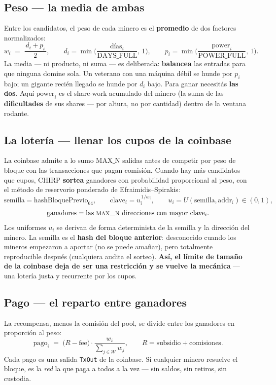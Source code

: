 \documentclass[11pt]{article}
\begin{document}
\subsection{Peso --- la media de ambas}
Entre los candidatos, el peso de cada minero es el \textbf{promedio} de dos factores normalizados:
\[
  w_i \;=\; \frac{\,d_i + p_i\,}{2},
  \qquad
  d_i = \min\!\Big(\frac{\text{d\'ias}_i}{\text{DAYS\_FULL}},\, 1\Big),
  \qquad
  p_i = \min\!\Big(\frac{\text{power}_i}{\text{POWER\_FULL}},\, 1\Big).
\]
La media --- ni producto, ni suma --- es deliberada: \textbf{balancea} las entradas para que ninguna
domine sola. Un veterano con una m\'aquina d\'ebil se hunde por $p_i$ bajo; un gigante reci\'en
llegado se hunde por $d_i$ bajo. Para ganar necesit\'as \textbf{las dos}. Aqu\'i $\text{power}_i$ es
el share-work acumulado del minero (la suma de las \textbf{dificultades} de sus shares --- por
altura, no por cantidad) dentro de la ventana rodante.

\subsection{La loter\'ia --- llenar los cupos de la coinbase}
La coinbase admite a lo sumo $\text{MAX\_N}$ salidas antes de competir por peso de bloque con las
transacciones que pagan comisi\'on. Cuando hay m\'as candidatos que cupos, CHIRP \textbf{sortea}
ganadores con probabilidad proporcional al peso, con el m\'etodo de reservorio ponderado de
Efraimidis--Spirakis:
\[
  \text{semilla} = \text{hashBloquePrevio}_{64},
  \qquad
  \text{clave}_i = u_i^{\,1/w_i},
  \qquad
  u_i = U(\text{semilla}, \text{addr}_i) \in (0,1),
\]
\[
  \text{ganadores} = \text{las } \textsc{max\_n} \text{ direcciones con mayor } \text{clave}_i .
\]
Los uniformes $u_i$ se derivan de forma determinista de la semilla y la direcci\'on del minero. La
semilla es el \textbf{hash del bloque anterior}: desconocido cuando los mineros empezaron a aportar
(no se puede amañar), pero totalmente reproducible despu\'es (cualquiera audita el sorteo).
\textbf{As\'i, el l\'imite de tama\~no de la coinbase deja de ser una restricci\'on y se vuelve la
mec\'anica} --- una loter\'ia justa y recurrente por los cupos.

\subsection{Pago --- el reparto entre ganadores}
La recompensa, menos la comisi\'on del pool, se divide entre los ganadores en proporci\'on al peso:
\[
  \text{pago}_i \;=\; \big(R - \text{fee}\big)\cdot
  \frac{w_i}{\displaystyle\sum_{j \in \mathcal{W}} w_j},
  \qquad
  R = \text{subsidio} + \text{comisiones}.
\]
Cada pago es una salida \texttt{TxOut} de la coinbase. Si cualquier minero resuelve el bloque, es la
\emph{red} la que paga a todos a la vez --- sin saldos, sin retiros, sin custodia.
\end{document}
